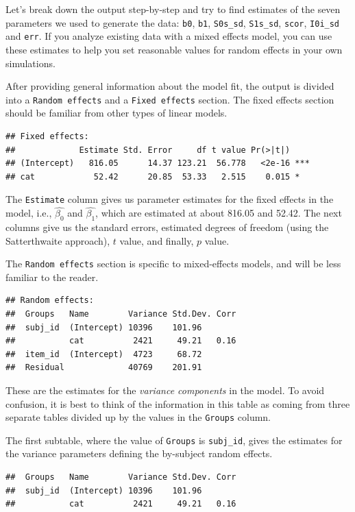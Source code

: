 \documentclass[man,floatsintext]{apa6}
\begin{document}
Let's break down the output step-by-step and try to find estimates of the seven parameters we used to generate the data: \texttt{b0}, \texttt{b1}, \texttt{S0s\_sd}, \texttt{S1s\_sd}, \texttt{scor}, \texttt{I0i\_sd} and \texttt{err}. If you analyze existing data with a mixed effects model, you can use these estimates to help you set reasonable values for random effects in your own simulations.

After providing general information about the model fit, the output is divided into a \texttt{Random\ effects} and a \texttt{Fixed\ effects} section. The fixed effects section should be familiar from other types of linear models.

\begin{verbatim}
## Fixed effects:
##             Estimate Std. Error     df t value Pr(>|t|)    
## (Intercept)   816.05      14.37 123.21  56.778   <2e-16 ***
## cat            52.42      20.85  53.33   2.515    0.015 *
\end{verbatim}

The \texttt{Estimate} column gives us parameter estimates for the fixed effects in the model, i.e., \(\hat{\beta_0}\) and \(\hat{\beta_1}\), which are estimated at about 816.05 and 52.42. The next columns give us the standard errors, estimated degrees of freedom (using the Satterthwaite approach), \(t\) value, and finally, \(p\) value.

The \texttt{Random\ effects} section is specific to mixed-effects models, and will be less familiar to the reader.

\begin{verbatim}
## Random effects:
##  Groups   Name        Variance Std.Dev. Corr
##  subj_id  (Intercept) 10396    101.96       
##           cat          2421     49.21   0.16
##  item_id  (Intercept)  4723     68.72       
##  Residual             40769    201.91
\end{verbatim}

These are the estimates for the \emph{variance components} in the model. To avoid confusion, it is best to think of the information in this table as coming from three separate tables divided up by the values in the \texttt{Groups} column.

The first subtable, where the value of \texttt{Groups} is \texttt{subj\_id}, gives the estimates for the variance parameters defining the by-subject random effects.

\begin{verbatim}
##  Groups   Name        Variance Std.Dev. Corr
##  subj_id  (Intercept) 10396    101.96       
##           cat          2421     49.21   0.16
\end{verbatim}
\end{document}
